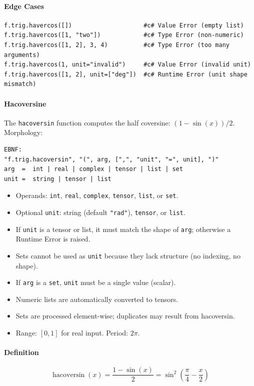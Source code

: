 \paragraph{Edge Cases}
\begin{verbatim}
f.trig.havercos([])                    #c# Value Error (empty list)
f.trig.havercos([1, "two"])            #c# Type Error (non-numeric)
f.trig.havercos([1, 2], 3, 4)          #c# Type Error (too many arguments)
f.trig.havercos(1, unit="invalid")     #c# Value Error (invalid unit)
f.trig.havercos([1, 2], unit=["deg"])  #c# Runtime Error (unit shape mismatch)
\end{verbatim}

\paragraph{Hacoversine}
The \texttt{hacoversin} function computes the half coversine: $(1 - \sin(x))/2$.\\
Morphology:
\begin{verbatim}
EBNF:
"f.trig.hacoversin", "(", arg, [",", "unit", "=", unit], ")"
arg  =  int | real | complex | tensor | list | set
unit =  string | tensor | list
\end{verbatim}
\begin{itemize}
\item Operands: \texttt{int}, \texttt{real}, \texttt{complex}, \texttt{tensor}, \texttt{list}, or \texttt{set}.
\item Optional \texttt{unit}: string (default \texttt{"rad"}), \texttt{tensor}, or \texttt{list}.
\item If \texttt{unit} is a tensor or list, it must match the shape of \texttt{arg}; otherwise a Runtime Error is raised.
\item Sets cannot be used as \texttt{unit} because they lack structure (no indexing, no shape).
\item If \texttt{arg} is a \texttt{set}, \texttt{unit} must be a single value (scalar).
\item Numeric lists are automatically converted to tensors.
\item Sets are processed element-wise; duplicates may result from hacoversin.
\item Range: $[0, 1]$ for real input. Period: $2\pi$.
\end{itemize}

\paragraph{Definition}
\[
\operatorname{hacoversin}(x) = \frac{1 - \sin(x)}{2} = \sin^2\left(\frac{\pi}{4} - \frac{x}{2}\right)
\]

